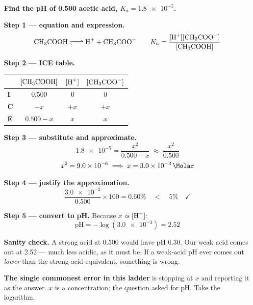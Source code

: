 \documentclass{apchem-worksheet}
\begin{document}
\begin{workedexample}
\textbf{Find the pH of \SI{0.500}{\Molar} acetic acid,
$K_{a} = \num{1.8e-5}$.}

\textbf{Step 1 --- equation and expression.}
\[ \ce{CH3COOH <=> H+ + CH3COO-}
   \qquad
   K_{a} = \frac{[\ce{H+}][\ce{CH3COO-}]}{[\ce{CH3COOH}]} \]

\textbf{Step 2 --- ICE table.}
\begin{center}
\renewcommand{\arraystretch}{1.2}
\begin{tabular}{@{}lccc@{}}
\toprule
& $[\ce{CH3COOH}]$ & $[\ce{H+}]$ & $[\ce{CH3COO-}]$ \\
\midrule
\textbf{I} & 0.500 & 0 & 0 \\
\textbf{C} & $-x$ & $+x$ & $+x$ \\
\textbf{E} & $0.500-x$ & $x$ & $x$ \\
\bottomrule
\end{tabular}
\end{center}

\textbf{Step 3 --- substitute and approximate.}
\[ \num{1.8e-5} = \frac{x^{2}}{0.500-x}
   \;\approx\; \frac{x^{2}}{0.500} \]
\[ x^{2} = \num{9.0e-6}
   \;\Longrightarrow\;
   x = \SI{3.0e-3}{\Molar} \]

\textbf{Step 4 --- justify the approximation.}
\[ \frac{\num{3.0e-3}}{0.500} \times 100 = 0.60\%
   \quad<\quad 5\% \quad\checkmark \]

\textbf{Step 5 --- convert to pH.} Because $x$ \emph{is} $[\ce{H+}]$:
\[ \text{pH} = -\log(\num{3.0e-3}) = \mathbf{2.52} \]

\textbf{Sanity check.} A strong acid at \SI{0.500}{\Molar} would have
pH 0.30. Our weak acid comes out at 2.52 --- much less acidic, as it
must be. If a weak-acid pH ever comes out \emph{lower} than the strong
acid equivalent, something is wrong.

\textbf{The single commonest error in this ladder} is stopping at $x$
and reporting it as the answer. $x$ is a concentration; the question
asked for pH. Take the logarithm.
\end{workedexample}
\end{document}
